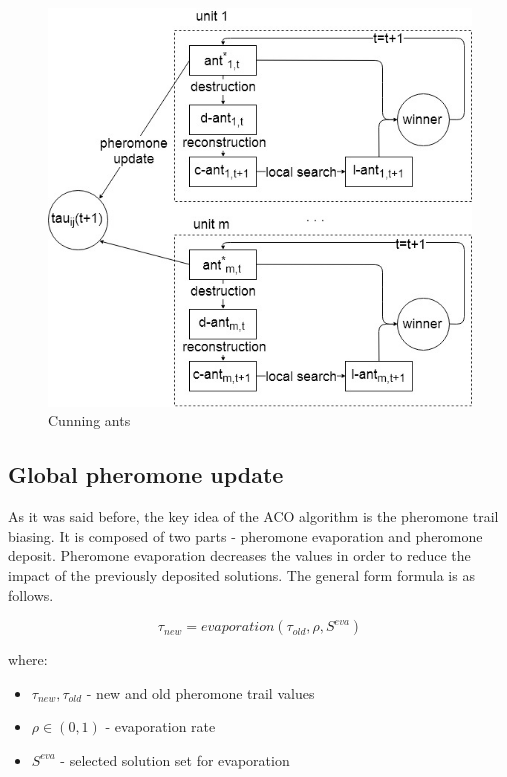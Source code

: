 \documentclass[12pt,a4paper,oneside]{book}
\begin{document}
\begin{figure}[h]
  \centering
    \includegraphics[scale=0.5]{cunning-ants.jpg}
  \caption{Cunning ants}
  \label{fig:cunning-ants}
\end{figure}


\subsection{Global pheromone update}
As it was said before, the key idea of the ACO algorithm is the pheromone trail biasing. It is composed of two parts - pheromone evaporation and pheromone deposit. Pheromone evaporation decreases the values in order to reduce the impact of the previously deposited solutions. The general form formula is as follows.

\begin{equation}
\tau_{new}=evaporation(\tau_{old}, \rho, S^{eva})
\end{equation}

where:
\begin{itemize}
\item $\tau_{new}, \tau_{old}$ - new and old pheromone trail values
\item $\rho \in (0,1)$ - evaporation rate
\item $S^{eva}$ - selected solution set for evaporation
\end{itemize}
\end{document}

